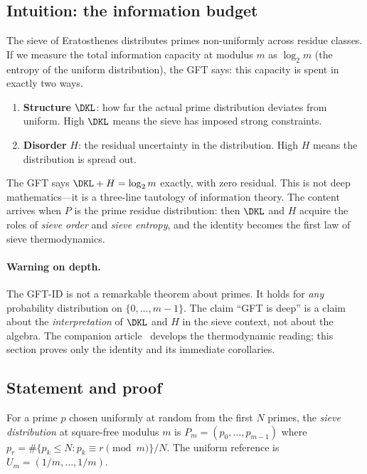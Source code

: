 \documentclass[12pt,a4paper]{article}
\begin{document}
\subsection{Intuition: the information budget}
\label{sec:ch4_intuition}

The sieve of Eratosthenes distributes primes non-uniformly across
residue classes. If we measure the total information capacity at
modulus $m$ as $\log_2 m$ (the entropy of the uniform distribution),
the GFT says: this capacity is spent in exactly two ways.

\begin{enumerate}
\item \textbf{Structure} $\DKL$: how far the actual prime distribution
  deviates from uniform. High $\DKL$ means the sieve has imposed strong
  constraints.
\item \textbf{Disorder} $H$: the residual uncertainty in the distribution.
  High $H$ means the distribution is spread out.
\end{enumerate}

The GFT says $\DKL + H = \log_2 m$ exactly, with zero residual. This
is not deep mathematics---it is a three-line tautology of information
theory. The content arrives when $P$ is the prime residue distribution:
then $\DKL$ and $H$ acquire the roles of \emph{sieve order} and
\emph{sieve entropy}, and the identity becomes the first law of
sieve thermodynamics.

\paragraph{Warning on depth.}
The GFT-ID is not a remarkable theorem about primes. It holds for
\emph{any} probability distribution on $\{0, \ldots, m-1\}$. The
claim ``GFT is deep'' is a claim about the \emph{interpretation} of
$\DKL$ and $H$ in the sieve context, not about the algebra.
The companion article~\cite{companion_M5} develops the thermodynamic reading; this section proves only
the identity and its immediate corollaries.

\subsection{Statement and proof}
\label{sec:gft_statement}

\begin{definition}
For a prime $p$ chosen uniformly at random from the first $N$ primes,
the \emph{sieve distribution} at square-free modulus $m$ is
$P_m = (p_0, \ldots, p_{m-1})$ where
$p_r = \#\{p_k \leq N : p_k \equiv r \pmod m\}/N$.
The uniform reference is $U_m = (1/m, \ldots, 1/m)$.
\end{definition}
\end{document}
